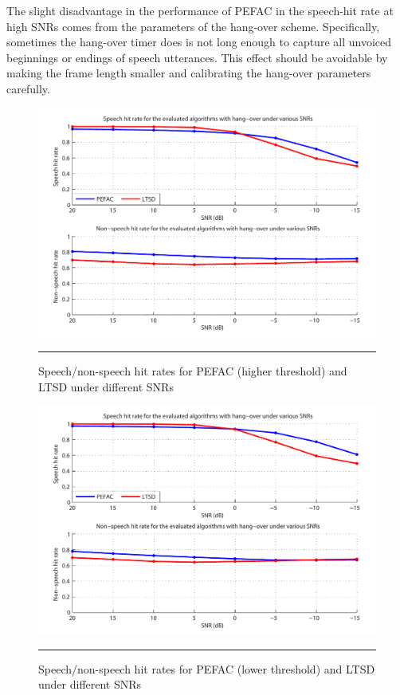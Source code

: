 The slight disadvantage in the performance of PEFAC in the speech-hit rate at high SNRs comes from the parameters of the hang-over scheme. Specifically, sometimes the hang-over timer does is not long enough to capture all unvoiced beginnings or endings of speech utterances. This effect should be avoidable by making the frame length smaller and calibrating the hang-over parameters carefully.


\begin{figure}[htbp]
	\centering
		\includegraphics[width=0.81\columnwidth]{Figures/Chapter5/pefacSNR60bold.pdf}
		\rule{37em}{0.5pt}
	\caption[Speech/non-speech hit rates for PEFAC (higher threshold) and LTSD under different SNRs]{Speech/non-speech hit rates for PEFAC (higher threshold) and LTSD under different SNRs}
	\label{fig:pefacSNR60}
\end{figure}

\begin{figure}[htbp]
	\centering
		\includegraphics[width=0.81\columnwidth]{Figures/Chapter5/pefacSNR55bold.pdf}
		\rule{37em}{0.5pt}
	\caption[Speech/non-speech hit rates for PEFAC (lower threshold) and LTSD under different SNRs]{Speech/non-speech hit rates for PEFAC (lower threshold) and LTSD under different SNRs}
	\label{fig:pefacSNR55}
\end{figure}

